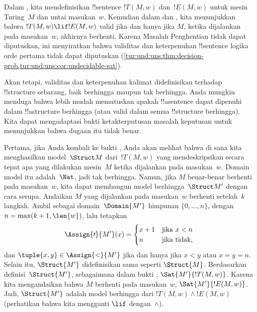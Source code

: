 \documentclass[../../../include/open-logic-section]{subfiles}
\begin{document}

\begin{explain}
  Dalam , kita mendefinisikan !!{sentence}
  $!T(M,w)$ dan~$!E(M,w)$ untuk mesin Turing~$M$ dan untai masukan~$w$.
  Kemudian dalam  dan
  , kita menunjukkan bahwa
  $!T(M,w) \lif !E(M,w)$ valid jika dan hanya jika $M$, ketika dijalankan
  pada masukan~$w$, akhirnya berhenti. Karena Masalah Penghentian tidak dapat
  diputuskan, ini menyiratkan bahwa validitas dan keterpenuhan !!{sentence}
  logika orde pertama tidak dapat diputuskan
  (\cref{tur:und:uns:thm:decision-prob,tur:und:uns:cor:undecidable-sat}).

  Akan tetapi, validitas dan keterpenuhan kalimat didefinisikan terhadap
  !!{structure} sebarang, baik berhingga maupun tak berhingga. Anda mungkin
  menduga bahwa lebih mudah memutuskan apakah !!a{sentence} dapat dipenuhi
  dalam !!a{structure} berhingga (atau valid dalam semua !!{structure}
  berhingga). Kita dapat mengadaptasi bukti ketakterputusan masalah keputusan
  untuk menunjukkan bahwa dugaan itu tidak benar.

  Pertama, jika Anda kembali ke bukti , Anda akan
  melihat bahwa di sana kita menghasilkan model~$\Struct M$ dari~$!T(M,w)$
  yang mendeskripsikan secara tepat apa yang dilakukan mesin~$M$ ketika
  dijalankan pada masukan~$w$. Domain model itu adalah~$\Nat$, jadi tak
  berhingga. Namun, jika $M$ benar-benar berhenti pada masukan~$w$, kita dapat
  membangun model berhingga~$\Struct M'$ dengan cara serupa. Andaikan $M$ yang
  dijalankan pada masukan~$w$ berhenti setelah~$k$ langkah. Ambil sebagai
  domain~$\Domain{M'}$ himpunan $\{0, \dots, n\}$, dengan
  $n = \max(k+1,\len{w})$, lalu tetapkan
  \[
    \Assign{\prime}{M'}(x) =
    \begin{cases}
      x + 1 &\text{jika $x < n$}\\
      n &\text{jika tidak,}
    \end{cases}
  \]
  dan $\tuple{x,y} \in \Assign{<}{M'}$ jika dan hanya jika $x < y$ atau
  $x = y = n$. Selain itu, $\Struct{M'}$ didefinisikan sama seperti
  $\Struct{M}$. Berdasarkan definisi~$\Struct{M'}$, sebagaimana dalam bukti
  , $\Sat{M'}{!T(M,w)}$. Karena kita
  mengandaikan bahwa $M$ berhenti pada masukan~$w$,
  $\Sat{M'}{!E(M,w)}$. Jadi, $\Struct{M'}$ adalah model berhingga dari
  $!T(M,w) \land !E(M,w)$ (perhatikan bahwa kita mengganti $\lif$
  dengan~$\land$).


\end{explain}
\end{document}
